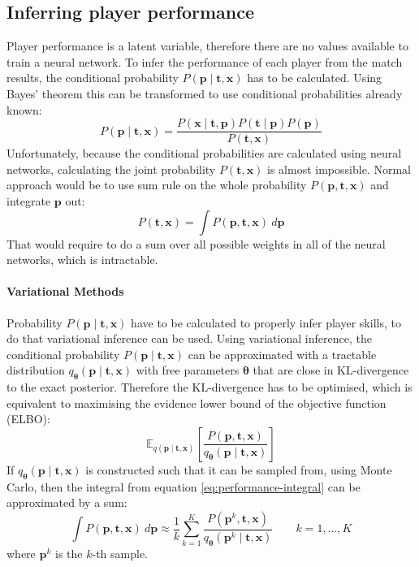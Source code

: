 \documentclass[12pt,a4paper]{book}
\newcommand\bs[1]{\boldsymbol{#1}}
\begin{document}
\subsection{Inferring player performance}
Player performance is a latent variable, therefore there are no values available to train a neural network.
To infer the performance of each player from the match results, the conditional probability $P(\bs{p}\mid\bs{t},\bs{x})$ has to be calculated.
Using Bayes' theorem this can be transformed to use conditional probabilities already known:
\begin{equation*}
P(\bs{p}\mid\bs{t},\bs{x}) = \frac{P(\bs{x}\mid\bs{t},\bs{p})P(\bs{t}\mid\bs{p})P(\bs{p})}{P(\bs{t},\bs{x})}
\end{equation*}
Unfortunately, because the conditional probabilities are calculated using neural networks, calculating the joint probability $P(\bs{t},\bs{x})$ is almost impossible.
Normal approach would be to use sum rule on the whole probability $P(\bs{p},\bs{t},\bs{x})$ and integrate $\bs{p}$ out:
\begin{equation}
P(\bs{t},\bs{x})=\int P(\bs{p},\bs{t},\bs{x})\ d\bs{p}
\label{eq:performance-integral}
\end{equation}
That would require to do a sum over all possible weights in all of the neural networks, which is intractable. 

\paragraph{Variational Methods}
Probability ${P(\bs{p}\mid\bs{t},\bs{x})}$ have to be calculated to properly infer player skills, to do that variational inference can be used.
Using variational inference, the conditional probability ${P(\bs{p}\mid\bs{t},\bs{x})}$ can be approximated with a tractable distribution $q_{\bs{\theta}}(\bs{p}\mid\bs{t},\bs{x})$ with free parameters $\bs{\theta}$ that are close in KL-divergence to the exact posterior.
Therefore the KL-divergence has to be optimised, which is equivalent to maximising the evidence lower bound of the objective function (ELBO):
\begin{equation*}
\mathbb{E}_{q(\bs{p}\mid\bs{t},\bs{x})}\left[\frac{P(\bs{p},\bs{t},\bs{x})}{q_{\bs{\theta}}(\bs{p}\mid\bs{t},\bs{x})}\right]
\end{equation*}
If $q_{\bs{\theta}}(\bs{p}\mid\bs{t},\bs{x})$ is constructed such that it can be sampled from, using Monte Carlo, then the integral from equation \ref{eq:performance-integral} can be approximated by a sum:
\begin{equation*}
\int P(\bs{p},\bs{t},\bs{x})\ d\bs{p} \approx \frac{1}{k}\sum\limits_{k=1}^{K}\frac{P(\bs{p}^k,\bs{t},\bs{x})}{q_{\bs{\theta}}(\bs{p}^k\mid\bs{t},\bs{x})} \qquad k=1,\dots,K
\end{equation*}
where $\bs{p}^k$ is the $k$-th sample.
\end{document}
